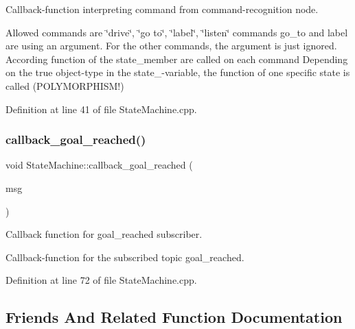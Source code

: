Callback-\/function interpreting command from command-\/recognition node.

Allowed commands are \char`\"{}drive\char`\"{}, \char`\"{}go to\char`\"{}, \char`\"{}label\char`\"{}, \char`\"{}listen\char`\"{} commands go\+\_\+to and label are using an argument. For the other commands, the argument is just ignored. According function of the state\+\_\+member are called on each command Depending on the true object-\/type in the state\+\_\+-\/variable, the function of one specific state is called (P\+O\+L\+Y\+M\+O\+R\+P\+H\+I\+S\+M!) 

Definition at line 41 of file State\+Machine.\+cpp.

\mbox{\label{class_state_machine_ae36de4ee8784f1ef63e5721aed3465fc}} 
\subsubsection{\texorpdfstring{callback\+\_\+goal\+\_\+reached()}{callback\_goal\_reached()}}
{\footnotesize\ttfamily void State\+Machine\+::callback\+\_\+goal\+\_\+reached (\begin{DoxyParamCaption}\item[{const std\+\_\+msgs\+::\+Bool\+::\+Const\+Ptr \&}]{msg }\end{DoxyParamCaption})}



Callback function for goal\+\_\+reached subscriber. 

Callback-\/function for the subscribed topic goal\+\_\+reached. 

Definition at line 72 of file State\+Machine.\+cpp.



\subsection{Friends And Related Function Documentation}
\mbox{\label{class_state_machine_a9f3d690f79a1c7f54e4417a8a3dfab55}} 
